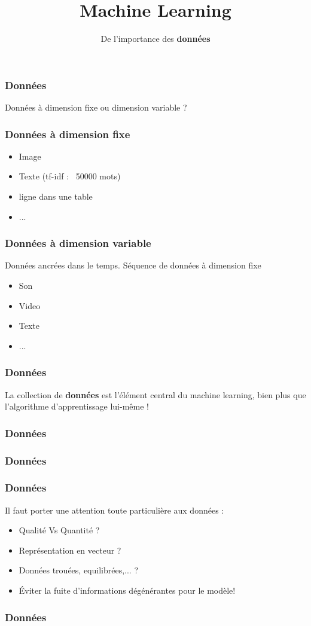 \documentclass{formation}
\title{Machine Learning}
\subtitle{De l'importance des \textbf{données}}
\begin{document}
\maketitle

\begin{frame}
  \frametitle{Données}
  Données à dimension fixe ou dimension variable ?
\end{frame}

\begin{frame}
  \frametitle{Données à dimension fixe}
  \begin{itemize}
  \item Image
  \item Texte (tf-idf : ~50000 mots)
  \item ligne dans une table
  \item ...
  \end{itemize}
\end{frame}

\begin{frame}
  \frametitle{Données à dimension variable}
  Données ancrées dans le temps.
  \newline
  Séquence de données à dimension fixe
  \begin{itemize}
  \item Son
  \item Video
  \item Texte
  \item ...
  \end{itemize}
\end{frame}

\begin{frame}
  \frametitle{Données}
  La collection de \textbf{données} est l'élément central du machine learning, bien plus que l'algorithme d'apprentissage lui-même !
\end{frame}

\begin{frame}
  \frametitle{Données}
\end{frame}

\begin{frame}
  \frametitle{Données}
\end{frame}

\begin{frame}
  \frametitle{Données}
  Il faut porter une attention toute particulière aux données :
  \begin{itemize}
  \item Qualité Vs Quantité ?
  \item Représentation en vecteur ?
  \item Données trouées, equilibrées,... ?
  \item Éviter la fuite d'informations dégénérantes pour le modèle!
  \end{itemize}
\end{frame}

\begin{frame}
  \frametitle{Données}
\end{frame}
\end{document}

